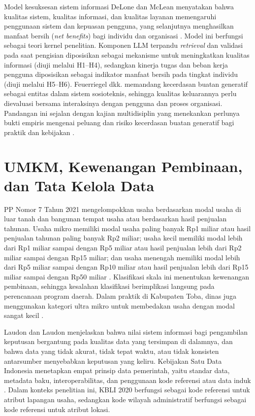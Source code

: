 \documentclass[12pt,a4paper]{report}
\begin{document}
Model kesuksesan sistem informasi DeLone dan McLean menyatakan bahwa kualitas sistem, kualitas informasi, dan kualitas layanan memengaruhi penggunaan sistem dan kepuasan pengguna, yang selanjutnya menghasilkan manfaat bersih (\textit{net benefits}) bagi individu dan organisasi \cite{delone2003success}. Model ini berfungsi sebagai teori kernel penelitian. Komponen LLM terpandu \textit{retrieval} dan validasi pada saat pengisian diposisikan sebagai mekanisme untuk meningkatkan kualitas informasi (diuji melalui H1--H4), sedangkan kinerja tugas dan beban kerja pengguna diposisikan sebagai indikator manfaat bersih pada tingkat individu (diuji melalui H5--H6). Feuerriegel dkk. \cite{feuerriegel2024genai} memandang kecerdasan buatan generatif sebagai entitas dalam sistem sosioteknis, sehingga kualitas keluarannya perlu dievaluasi bersama interaksinya dengan pengguna dan proses organisasi. Pandangan ini sejalan dengan kajian multidisiplin yang menekankan perlunya bukti empiris mengenai peluang dan risiko kecerdasan buatan generatif bagi praktik dan kebijakan \cite{dwivedi2023chatgpt}.

\section{UMKM, Kewenangan Pembinaan, dan Tata Kelola Data}
\label{sec:umkm}

PP Nomor 7 Tahun 2021 mengelompokkan usaha berdasarkan modal usaha di luar tanah dan bangunan tempat usaha atau berdasarkan hasil penjualan tahunan. Usaha mikro memiliki modal usaha paling banyak Rp1 miliar atau hasil penjualan tahunan paling banyak Rp2 miliar; usaha kecil memiliki modal lebih dari Rp1 miliar sampai dengan Rp5 miliar atau hasil penjualan lebih dari Rp2 miliar sampai dengan Rp15 miliar; dan usaha menengah memiliki modal lebih dari Rp5 miliar sampai dengan Rp10 miliar atau hasil penjualan lebih dari Rp15 miliar sampai dengan Rp50 miliar \cite{pp7tahun2021}. Klasifikasi skala ini menentukan kewenangan pembinaan, sehingga kesalahan klasifikasi berimplikasi langsung pada perencanaan program daerah. Dalam praktik di Kabupaten Toba, dinas juga menggunakan kategori ultra mikro untuk membedakan usaha dengan modal sangat kecil \cite{wawancarastaf2026}.

Laudon dan Laudon \cite{laudon2022mis} menjelaskan bahwa nilai sistem informasi bagi pengambilan keputusan bergantung pada kualitas data yang tersimpan di dalamnya, dan bahwa data yang tidak akurat, tidak tepat waktu, atau tidak konsisten antarsumber menyebabkan keputusan yang keliru. Kebijakan Satu Data Indonesia menetapkan empat prinsip data pemerintah, yaitu standar data, metadata baku, interoperabilitas, dan penggunaan kode referensi atau data induk \cite{perpres39tahun2019}. Dalam konteks penelitian ini, KBLI 2020 berfungsi sebagai kode referensi untuk atribut lapangan usaha, sedangkan kode wilayah administratif berfungsi sebagai kode referensi untuk atribut lokasi.
\end{document}
